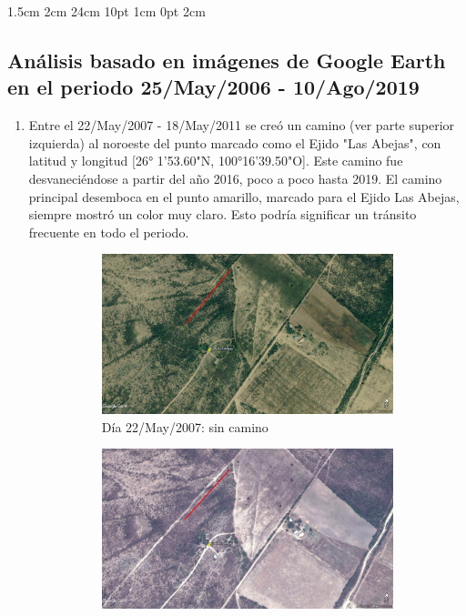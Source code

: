 \documentclass[12pt,letterpaper]{article}
\begin{document}
\setmargins{2.5cm}      
{1.5cm}                     
{2cm}  
{24cm}                    
{10pt}                          
{1cm}                          
{0pt}                             
{2cm}
\subsection*{Análisis basado en imágenes de Google Earth en el periodo 25/May/2006 - 10/Ago/2019}
\begin{enumerate}
    \item Entre el 22/May/2007 - 18/May/2011 se creó un camino (ver parte superior izquierda) al noroeste del punto marcado como el Ejido "Las Abejas", con latitud y longitud [26° 1'53.60"N, 100°16'39.50"O]. Este camino fue desvaneciéndose a partir del año 2016, poco a poco hasta 2019. El camino principal desemboca en el punto amarillo, marcado para el Ejido Las Abejas, siempre mostró un color muy claro. Esto podría significar un tránsito frecuente en todo el periodo.
    \begin{figure}[H]
        \centering
        \begin{subfigure}{3.5\textwidth}
            \includegraphics[scale=0.155]{070522r.jpg}
            \caption{Día 22/May/2007: sin camino}
        \end{subfigure}
        \begin{subfigure}{3.5\textwidth}
            \includegraphics[scale=0.155]{110518r.jpg}

\end{subfigure}
\end{figure}
\end{enumerate}
\end{document}
